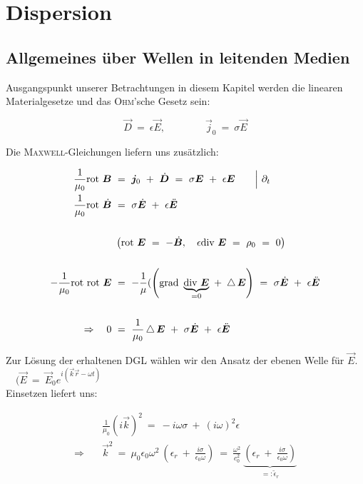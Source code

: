 \chapter{Dispersion}

\section{Allgemeines über Wellen in leitenden Medien}

Ausgangspunkt unserer Betrachtungen in diesem Kapitel werden die linearen Materialgesetze und das \textsc{Ohm}'sche Gesetz sein:

\begin{equation*}
\vec{D}  \ = \ \epsilon \vec{E}, \qquad\qquad\vec{j}_0  \ = \ \sigma\vec{E}
\end{equation*}

Die \textsc{Maxwell}-Gleichungen liefern uns zusätzlich:

\begin{align*}
\frac{1}{\mu_0}\rot\vec{B}  \ &= \  \vec{j}_0 \ + \ \dot{\vec{D}}  \ = \ \sigma\vec{E} \ + \ \epsilon\vec{E} \qquad\Big| \ \partial_t\\
\frac{1}{\mu_0}\rot\dot{\vec{B}} \ &= \ \sigma\dot{\vec{E}} \ + \ \epsilon\ddot{\vec{E}}\\
\ \\
&\left(\rot\vec{E} \ = \ -\dot{\vec{B}}, \quad \epsilon\div\vec{E} \ = \ \rho_0  \ = \ 0\right)\\
\ \\
-\frac{1}{\mu_0} \rot\rot \vec{E}  \ &= \ - \frac{1}{\mu}(\left(\grad\underbrace{\div\vec{E}}_{=0} \ + \ \laplace\vec{E}\right)  \ = \ \sigma\dot{\vec{E}} \ + \ \epsilon\ddot{\vec{E}}\\
\ \\
\Rightarrow \quad 0  \ &= \ \frac{1}{\mu_0}\laplace\vec{E} \ + \ \sigma\dot{\vec{E}}\ + \ \epsilon\ddot{\vec{E}} 
\end{align*}

Zur Lösung der erhaltenen DGL wählen wir den Ansatz der ebenen Welle für $\vec{E}$. $\quad(\vec{E} \ = \ \vec{E}_0 e^{i(\vec{k}\vec{r}-\omega t)}$\\
Einsetzen liefert uns:

\begin{align*}
&\frac{1}{\mu_0} \left(i\vec{k}\right)^2  \ = \ -i \omega \sigma \ + \  \left(i\omega\right)^2\epsilon\\
\Rightarrow\quad &\vec{k}^2 \ = \ \mu_0\epsilon_0\omega^2 \ \left(\epsilon_r \ + \ \frac{i\sigma}{\epsilon_0\omega}\right) \ = \ \frac{\omega^2}{c_0^2} \ \underbrace{\left(\epsilon_r \ + \ \frac{i\sigma}{\epsilon_0 \omega}\right)}_{=:\tilde{\epsilon}_r}
\end{align*}


